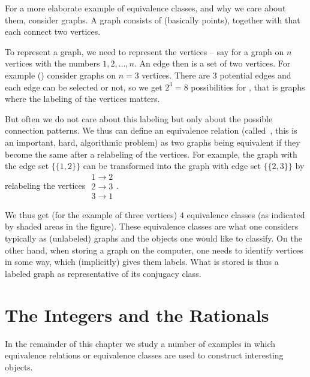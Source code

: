 For a more elaborate example of equivalence classes, and why we care about
them, consider graphs. A graph consists of  (basically
points), together with  that each connect two vertices.

To represent a graph, we need to represent the vertices -- say for a graph
on $n$ vertices with the numbers $1,2,\ldots,n$. An edge then is a set of
two vertices. For example () consider graphs on $n=3$
vertices. There are 3 potential edges and each edge can be selected or not,
so we get $2^3=8$ possibilities for , that is graphs
where the labeling of the vertices matters.

But often we do not care about this labeling but only  about the possible
connection patterns. We thus can define an equivalence relation
(called~, this is an important, hard, algorithmic
problem) 
as two graphs being equivalent if they become the same after a
relabeling of the vertices. For example, the graph with the edge set
$\{\{1,2\}\}$ can be transformed into the graph with edge set $\{\{2,3\}\}$ by
relabeling 
the vertices $\begin{array}{c}1\to 2\\2\to3\\3\to1\end{array}$.

We thus get (for the example of three vertices) $4$ equivalence classes
(as indicated by shaded areas in the figure). These equivalence classes are
what one considers typically as (unlabeled) graphs and the objects one would
like to classify. On the other hand, when storing a graph on the computer,
one needs to identify vertices in some way, which (implicitly) gives them
labels. What is stored is thus a labeled graph as representative of its
conjugacy class.

\section{The Integers and the Rationals}

In the remainder of this chapter we study a number of examples in which
equivalence relations or equivalence classes are used to construct
interesting objects.
\smallskip

